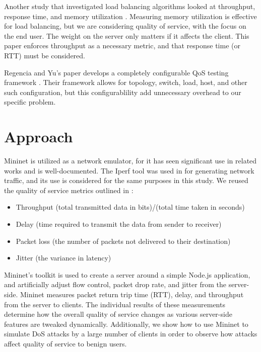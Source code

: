 \documentclass{article}
\begin{document}
Another study that investigated load balancing algorithms looked at throughput, response time, and memory utilization \cite{babbar_2022}. Measuring memory utilization 
is effective for load balancing, but we are considering quality of service, with the focus on the end user. The weight on the server only matters if it affects the 
client. This paper enforces throughput as a necessary metric, and that response time (or RTT) must be considered. 

Regencia and Yu's paper develops a completely configurable QoS testing framework \cite{regencia_2021}. Their framework allows for topology, switch, load, host, and 
other such configuration, but this configurablility add unnecessary overhead to our specific problem. 

\section{Approach}
Mininet is utilized as a network emulator, for it has seen significant use in related works \cite{mininet_emulation_2014,qos_analysis_2022,chauhan_atulkar_2020} and 
is well-documented. The Iperf tool was used in \cite{chauhan_atulkar_2020} for generating network traffic, and its use is considered for the same purposes in this 
study. We reused the quality of service metrics outlined in \cite{qos_analysis_2022}: 
\begin{itemize}
    \item Throughput (total transmitted data in bits)/(total time taken in seconds)
    \item Delay (time required to transmit the data from sender to receiver)
    \item Packet loss (the number of packets not delivered to their destination)
    \item Jitter (the variance in latency)
\end{itemize} 

Mininet's toolkit is used to create a server around a simple Node.js application, and artificially adjust flow control, packet drop rate, and jitter from the server-side. 
Mininet measures packet return trip time (RTT), delay, and throughput from the server to clients. The individual results of these measurements determine how the overall 
quality of service changes as various server-side features are tweaked dynamically. Additionally, we show how to use Mininet to simulate DoS attacks by a large number 
of clients in order to observe how attacks affect quality of service to benign users.
\end{document}
